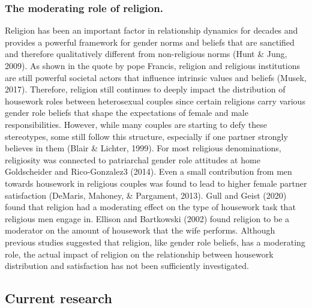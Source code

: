 \documentclass[
  english,
  man]{apa6}
\begin{document}
\hypertarget{the-moderating-role-of-religion.}{%
\subsubsection{The moderating role of religion.}\label{the-moderating-role-of-religion.}}

Religion has been an important factor in relationship dynamics for decades and provides a powerful framework for gender norms and beliefs that are sanctified and therefore qualitatively different from non-religious norms (Hunt \& Jung, 2009). As shown in the quote by pope Francis, religion and religious institutions are still powerful societal actors that influence intrinsic values and beliefs (Musek, 2017). Therefore, religion still continues to deeply impact the distribution of housework roles between heterosexual couples since certain religions carry various gender role beliefs that shape the expectations of female and male responsibilities. However, while many couples are starting to defy these stereotypes, some still follow this structure, especially if one partner strongly believes in them (Blair \& Lichter, 1999).
For most religious denominations, religiosity was connected to patriarchal gender role attitudes at home Goldscheider and Rico-Gonzalez3 (2014). Even a small contribution from men towards housework in religious couples was found to lead to higher female partner satisfaction (DeMaris, Mahoney, \& Pargament, 2013).
Gull and Geist (2020) found that religion had a moderating effect on the type of housework task that religious men engage in. Ellison and Bartkowski (2002) found religion to be a moderator on the amount of housework that the wife performs. Although previous studies suggested that religion, like gender role beliefs, has a moderating role, the actual impact of religion on the relationship between housework distribution and satisfaction has not been sufficiently investigated.

\hypertarget{current-research}{%
\subsection{Current research}\label{current-research}}
\end{document}
